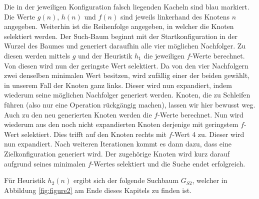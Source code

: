Die in der jeweiligen Konfiguration falsch liegenden Kacheln sind blau markiert. Die Werte $g(n)$, $h(n)$ und $f(n)$ sind jeweils linkerhand des Knotens $n$ angegeben. Weiterhin ist die Reihenfolge angegeben, in welcher die Knoten selektiert werden.
Der Such-Baum beginnt mit der Startkonfiguration in der Wurzel des Baumes und generiert daraufhin alle vier möglichen Nachfolger. Zu diesen werden mittels $g$ und der Heuristik $h_{1}$ die jeweiligen $f$-Werte berechnet. Von diesen wird nun der geringste Wert selektiert. Da von den vier Nachfolgern zwei denselben minimalen Wert besitzen, wird zufällig einer der beiden gewählt, in unserem Fall der Knoten ganz links. Dieser wird nun expandiert, indem wiederum seine möglichen Nachfolger generiert werden. Knoten, die zu Schleifen führen (also nur eine Operation rückgängig machen), lassen wir hier bewusst weg. Auch zu den neu generierten Knoten werden die $f$-Werte berechnet. Nun wird wiederum aus den noch nicht expandierten Knoten derjenige mit geringstem $f$-Wert selektiert. Dies trifft auf den Knoten rechts mit $f$-Wert 4 zu. Dieser wird nun expandiert. Nach weiteren Iterationen kommt es dann dazu, dass eine Zielkonfiguration generiert wird. Der zugehörige Knoten wird kurz darauf aufgrund seines minimalen $f$-Wertes selektiert und die Suche endet erfolgreich.

Für Heuristik $h_{2}(n)$ ergibt sich der folgende Suchbaum $G_{S2}$, welcher in Abbildung \ref{fig:figure2} am Ende dieses Kapitels zu finden ist.

